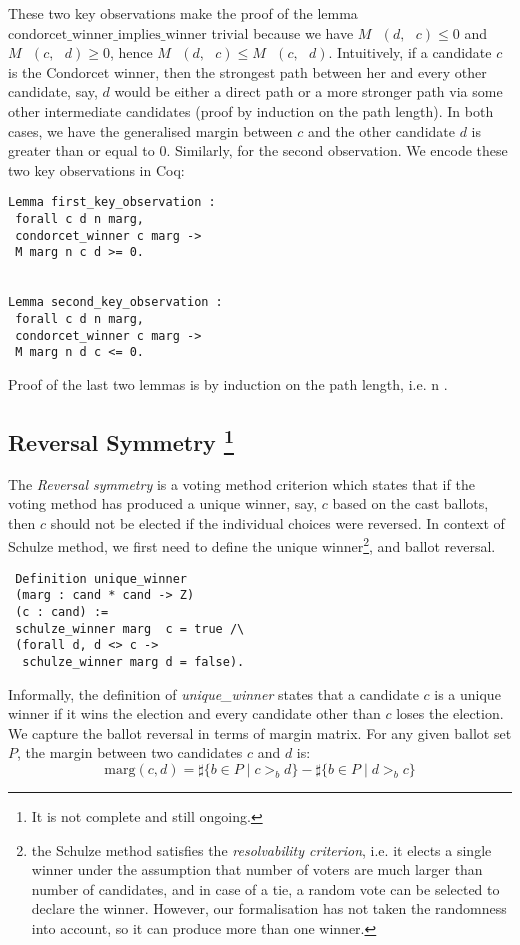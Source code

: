 \documentclass[compsoc,conference,a4paper,10pt,times]{IEEEtran}
\begin{document}
 
 These two key observations make the proof of the lemma
 $\mathrm{condorcet\_winner\_implies\_winner}$  
 trivial because we have $M \text{ } (d, \text{ }c) \leq 0$  and
  $M \text{ } (c, \text{ }d) \geq 0$, hence $M \text{ } (d, \text{ }c)  \leq 
   M \text{ } (c, \text{ }d)$. Intuitively, 
 if a candidate $c$ is the Condorcet winner, then the strongest path between her and every other 
 candidate, say, $d$ would be either a direct path or a more stronger path 
 via some other intermediate candidates (proof by induction on the path length). 
 In both cases, we have the generalised margin between 
 $c$ and the other candidate $d$ is greater than or equal to 0. 
 Similarly, for the second observation. We encode these two key observations in 
 Coq:
 
 \begin{verbatim}
Lemma first_key_observation : 
 forall c d n marg, 
 condorcet_winner c marg -> 
 M marg n c d >= 0.


Lemma second_key_observation : 
 forall c d n marg, 
 condorcet_winner c marg -> 
 M marg n d c <= 0.

 \end{verbatim}

Proof of the last two lemmas is by induction on the path length, i.e. n \cite{Carre:1971:ANR}. 







\subsection{Reversal Symmetry \footnote{It is not complete and still ongoing.}}
 The \textit{Reversal symmetry} is a voting method criterion which states that if the
 voting method has produced a unique 
  winner, say, $c$ based on the cast ballots, then $c$ should not be elected if the 
 individual choices were reversed. 
 In context of Schulze method, we first need to define the unique winner\footnote{
 the Schulze method satisfies the 
 \textit{resolvability criterion}, i.e. it elects a single winner under the 
 assumption that number of voters are much larger than
 number of candidates, and in case of a tie,
 a random vote can be selected to declare the winner.  However, our 
 formalisation has not taken the randomness into account, so it can 
 produce more than one winner.}, and ballot reversal. 
 
 \begin{verbatim}
 Definition unique_winner 
 (marg : cand * cand -> Z) 
 (c : cand) :=
 schulze_winner marg  c = true /\
 (forall d, d <> c -> 
  schulze_winner marg d = false).
\end{verbatim}  
\noindent
Informally, the definition of \textit{unique\_winner} states that a 
candidate $c$ is a unique winner
if it wins the election and every candidate 
other than $c$ loses the election.
We capture the ballot reversal in terms of margin matrix. For any given ballot set $P$, 
the margin between two candidates $c$ and $d$ is: 
\[
  \mathrm{marg}(c, d) = \sharp \lbrace b \in P \mid c >_b d \rbrace -
            \sharp \lbrace b \in P \mid d >_b c \rbrace
\] 
\end{document}
